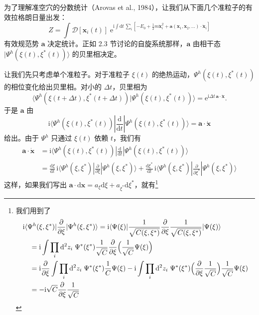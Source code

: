 为了理解准空穴的分数统计（Arovas et al., 1984），让我们从下面几个准粒子的有效拉格朗日量出发：
\begin{equation*}
Z=\int\mathcal{D}[\pmb{x}_i(t)]\;\mathrm{e}^{\mathrm{i}\int\mathrm{d}t\,\sum_i[-E_0+\frac{1}{2}m\dot{\pmb{x}}_i^2+\pmb{a}(\pmb{x}_1,\pmb{x}_2,\ldots)\cdot\dot{\pmb{x}}_i]}
\end{equation*}
有效规范势 $\pmb{a}$ 决定统计。正如 2.3 节讨论的自旋系统那样，$\pmb{a}$ 由相干态 $|\Psi^h(\xi(t),\xi^*(t))\rangle$ 的贝里相决定。

让我们先只考虑单个准粒子。对于准粒子 $\xi(t)$ 的绝热运动，$\Psi^h(\xi(t),\xi^*(t))$ 的相位变化给出贝里相。对小的 $\Delta t$，贝里相为
\begin{equation*}
\langle\Psi^h(\xi(t+\Delta t),\xi^*(t+\Delta t))|\Psi^h(\xi(t),\xi^*(t))\rangle=\mathrm{e}^{\mathrm{i}\Delta t\,\pmb{a}\cdot\dot{\pmb{x}}}.
\end{equation*}
于是 $\pmb{a}$ 由
\begin{equation*}
\mathrm{i}\langle\Psi^h(\xi(t),\xi^*(t))|\frac{\mathrm{d}}{\mathrm{d}t}|\Psi^h(\xi(t),\xi^*(t))\rangle=\pmb{a}\cdot\dot{\pmb{x}}
\end{equation*}
给出。由于 $\Psi^h$ 只通过 $\xi(t)$ 依赖 $t$，我们有
\begin{align*}
\pmb{a}\cdot\dot{\pmb{x}}&=\mathrm{i}\langle\Psi^h(\xi(t),\xi^*(t))|\frac{\mathrm{d}}{\mathrm{d}t}|\Psi^h(\xi(t),\xi^*(t))\rangle\\
&=\frac{\mathrm{d}\xi}{\mathrm{d}t}\,\mathrm{i}\langle\Psi^h(\xi,\xi^*)|\frac{\partial}{\partial\xi}|\Psi^h(\xi,\xi^*)\rangle+\frac{\mathrm{d}\xi^*}{\mathrm{d}t}\,\mathrm{i}\langle\Psi^h(\xi,\xi^*)|\frac{\partial}{\partial\xi^*}|\Psi^h(\xi,\xi^*)\rangle
\end{align*}
这样，如果我们写出 $\pmb{a}\cdot\mathrm{d}\pmb{x}=a_\xi\mathrm{d}\xi+a_{\xi^*}\mathrm{d}\xi^*$，就有\footnote{我们用到了
\[
\begin{aligned}
&\mathrm{i}\langle\Psi^h(\xi,\xi^*)|\frac{\partial}{\partial\xi}|\Psi^h(\xi,\xi^*)\rangle=\mathrm{i}\langle\Psi(\xi)|\frac{1}{\sqrt{C(\xi,\xi^*)}}\frac{\partial}{\partial\xi}\frac{1}{\sqrt{C(\xi,\xi^*)}}|\Psi(\xi)\rangle\\
&\quad=\mathrm{i}\int\prod_i\mathrm{d}^2z_i\;\Psi^*(\xi^*)\frac{1}{\sqrt{C}}\frac{\partial}{\partial\xi}\Bigl(\frac{1}{\sqrt{C}}\Psi(\xi)\Bigr)\\
&\quad=\mathrm{i}\frac{\partial}{\partial\xi}\int\prod_i\mathrm{d}^2z_i\;\Psi^*(\xi^*)\frac{1}{C}\Psi(\xi)-\mathrm{i}\int\prod_i\mathrm{d}^2z_i\;\Psi^*(\xi^*)\Bigl(\frac{\partial}{\partial\xi}\frac{1}{\sqrt{C}}\Bigr)\frac{1}{\sqrt{C}}\Psi(\xi)\\
&\quad=-\mathrm{i}\sqrt{C}\frac{\partial}{\partial\xi}\frac{1}{\sqrt{C}}
\end{aligned}
\]}
